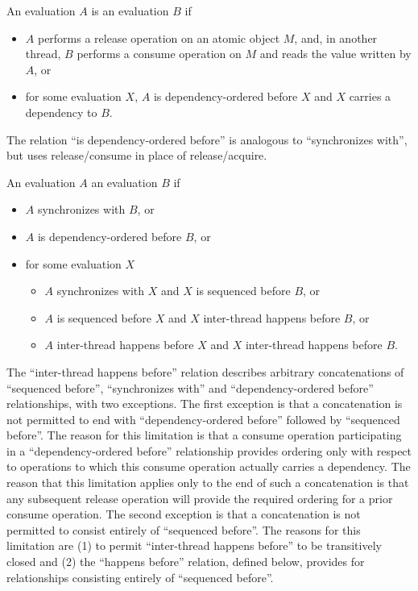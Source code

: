 \pnum
An evaluation $A$ is  an evaluation
$B$ if
\begin{itemize}
\item
$A$ performs a release operation on an atomic object $M$, and, in
another thread, $B$ performs a consume operation on $M$ and reads
the value written by $A$, or

\item
for some evaluation $X$, $A$ is dependency-ordered before $X$ and
$X$ carries a dependency to $B$.
\end{itemize}
\begin{note}
The relation ``is dependency-ordered before'' is analogous to
``synchronizes with'', but uses release/consume in place of release/acquire.
\end{note}

\pnum
An evaluation $A$  an evaluation $B$
if
\begin{itemize}
\item
  $A$ synchronizes with $B$, or
\item
  $A$ is dependency-ordered before $B$, or
\item
  for some evaluation $X$
  \begin{itemize}
  \item
    $A$ synchronizes with $X$ and $X$
    is sequenced before $B$, or
  \item
    $A$ is sequenced before $X$ and $X$
    inter-thread happens before $B$, or
  \item
    $A$ inter-thread happens before $X$ and $X$
    inter-thread happens before $B$.
  \end{itemize}
\end{itemize}
\begin{note}
The ``inter-thread happens before'' relation describes arbitrary
concatenations of ``sequenced before'', ``synchronizes with'' and
``dependency-ordered before'' relationships, with two exceptions. The first
exception is that a concatenation is not permitted to end with
``dependency-ordered before'' followed by ``sequenced before''. The reason for
this limitation is that a consume operation participating in a
``dependency-ordered before'' relationship provides ordering only with respect
to operations to which this consume operation actually carries a dependency. The
reason that this limitation applies only to the end of such a concatenation is
that any subsequent release operation will provide the required ordering for a
prior consume operation. The second exception is that a concatenation is not
permitted to consist entirely of ``sequenced before''. The reasons for this
limitation are (1) to permit ``inter-thread happens before'' to be transitively
closed and (2) the ``happens before'' relation, defined below, provides for
relationships consisting entirely of ``sequenced before''.
\end{note}

